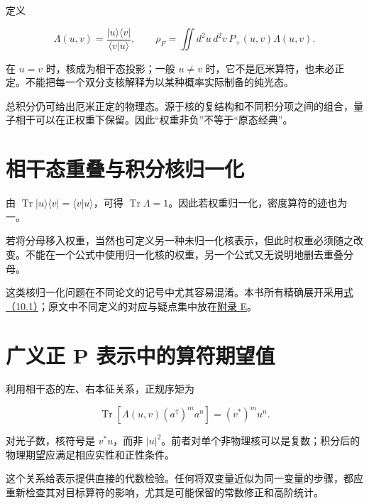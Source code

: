\documentclass[UTF8,a4paper,zihao=-4,openany,fontset=fandol]{ctexbook}
\begin{document}
定义



\begin{equation*}
\Lambda(u,v)=\frac{|u\rangle\langle v|}{\langle v|u\rangle},\qquad
\rho_F=\iint d^2u\,d^2v\,P_+(u,v)\Lambda(u,v).
\tag{10.1}\label{eq:10.1}
\end{equation*}


在 $u=v$ 时，核成为相干态投影；一般 $u\ne v$ 时，它不是厄米算符，也未必正定。不能把每一个双分支核解释为以某种概率实际制备的纯光态。



总积分仍可给出厄米正定的物理态。源于核的复结构和不同积分项之间的组合，量子相干可以在正权重下保留。因此“权重非负”不等于“原态经典”。



\section{相干态重叠与积分核归一化}\label{sec:10:4}


由 $\operatorname{Tr}|u\rangle\langle v|=\langle v|u\rangle$，可得 $\operatorname{Tr}\Lambda=1$。因此若权重归一化，密度算符的迹也为一。



若将分母移入权重，当然也可定义另一种未归一化核表示，但此时权重必须随之改变。不能在一个公式中使用归一化核的权重，另一个公式又无说明地删去重叠分母。



这类核归一化问题在不同论文的记号中尤其容易混淆。本书所有精确展开采用\hyperref[eq:10.1]{式（10.1）}；原文中不同定义的对应与疑点集中放在\hyperref[ch:E]{附录 E}。



\section{广义正 P 表示中的算符期望值}\label{sec:10:5}


利用相干态的左、右本征关系，正规序矩为



\begin{equation*}
\operatorname{Tr}\left[\Lambda(u,v)(a^\dagger)^ma^n\right]
=(v^*)^m u^n.
\tag{10.2}\label{eq:10.2}
\end{equation*}


对光子数，核符号是 $v^*u$，而非 $|u|^2$。前者对单个非物理核可以是复数；积分后的物理期望应满足相应实性和正性条件。



这个关系给表示提供直接的代数检验。任何将双变量近似为同一变量的步骤，都应重新检查其对目标算符的影响，尤其是可能保留的常数修正和高阶统计。
\end{document}
